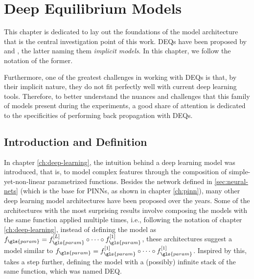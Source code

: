 \chapter{Deep Equilibrium Models}\label{ch:deq}

This chapter is dedicated to lay out the foundations of the model architecture that is the central investigation point of this work.
\gls{DEQ}s have been proposed by \textcite{Bai2019} and \textcite{Ghaoui2019}, the latter naming them \emph{implicit models}.
In this chapter, we follow the notation of the former.

Furthermore, one of the greatest challenges in working with \gls{DEQ}s is that, by their implicit nature, they do not fit perfectly well with current deep learning tools.
Therefore, to better understand the nuances and challenges that this family of models present during the experiments, a good share of attention is dedicated to the specificities of performing back propagation with \gls{DEQ}s.

\section{Introduction and Definition}

In chapter \ref{ch:deep-learning}, the intuition behind a deep learning model was introduced, that is, to model complex features through the composition of simple-yet-non-linear parametrized functions.
Besides the network defined in \ref{sec:neural-nets} (which is the base for \gls{PINN}s, as shown in chapter \ref{ch:pinn}), many other deep learning model architectures have been proposed over the years.
    Some of the architectures with the most surprising results involve composing the models with the same function applied multiple times, i.e., following the notation of chapter \ref{ch:deep-learning}, instead of defining the model as $f_{\gls{param}}=f_{\gls{param}}^{[L]}\circ \cdots \circ f_{\gls{param}}^{[1]}$, these architectures suggest a model similar to $f_{\gls{param}}=f_{\gls{param}}^{[1]}\circ \cdots \circ f_{\gls{param}}^{[1]}$.
Inspired by this, \textcite{Bai2019} takes a step further, defining the model with a (possibly) infinite stack of the same function, which was named \gls{DEQ}.

